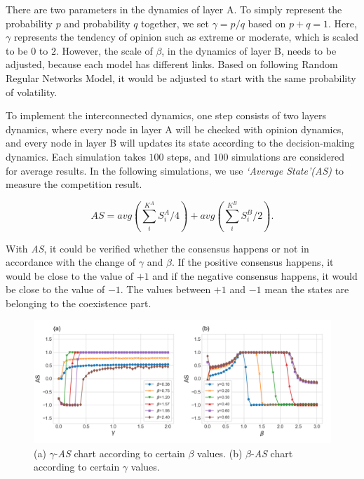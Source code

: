 \documentclass[english]{cccconf}
\begin{document}
There are two parameters in the dynamics of layer A. To simply represent the probability $p$ and probability $q$ together, we set $\gamma = p/q$ based on $p+q=1$. Here, $\gamma$ represents the tendency of opinion such as extreme or moderate, which is scaled to be $0$ to $2$. However, the scale of $\beta$, in the dynamics of layer B, needs to be adjusted, because each model has different links. Based on following Random Regular Networks Model, it would be adjusted to start with the same probability of volatility. 

To implement the interconnected dynamics, one step consists of two layers dynamics, where every node in layer A will be checked with opinion dynamics, and every node in layer B will updates its state according to the decision-making dynamics. Each simulation takes $100$ steps, and $100$ simulations are considered for average results. In the following simulations, we use \textit{`Average State'(AS)} to measure the competition result.

\begin{equation}
AS = avg\left( {\sum\limits_i^{{K^A}} {S_i^A/4} } \right) + avg\left( {\sum\limits_i^{{K^B}} {S_i^B/2} } \right).
\end{equation}

With \textit{AS}, it could be verified whether the consensus happens or not in accordance with the change of $\gamma$ and $\beta$.  If the positive consensus happens, it would be close to the value of $+1$ and if the negative consensus happens, it would be close to the value of $-1$. The values between $+1$ and $-1$ mean the states are belonging to the coexistence part.

\begin{figure}[!htb]
	\centering
	\includegraphics[width=\hsize]{FIG2.png}
	\caption{(a) $\gamma$-\textit{AS} chart according to certain $\beta$ values. (b) $\beta$-\textit{AS} chart according to certain $\gamma$ values.}
	\label{Fig2}
\end{figure}
\end{document}
